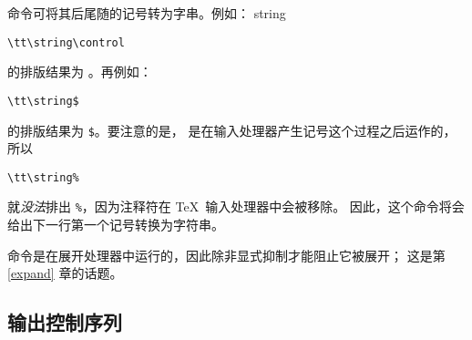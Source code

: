 \documentclass{book}
\begin{document}
 命令可将其后尾随的记号转为字串。例如：
\cstoidx string\par
\begin{verbatim}
\tt\string\control
\end{verbatim}
的排版结果为 。再例如：
\begin{verbatim}
\tt\string$
\end{verbatim}
的排版结果为 \verb-$-。要注意的是，
 是在输入处理器产生记号这个过程之后运作的，所以
\begin{verbatim}
\tt\string%
\end{verbatim}
就\emph{没法}排出 \verb-%-，因为注释符在 \TeX\ 输入处理器中会被移除。
因此，这个命令将会给出下一行第一个记号转换为字符串。

 命令是在展开处理器中运行的，因此除非显式抑制才能阻止它被展开；
这是第 \ref{expand} 章的话题。

\subsection{输出控制序列}
\end{document}

